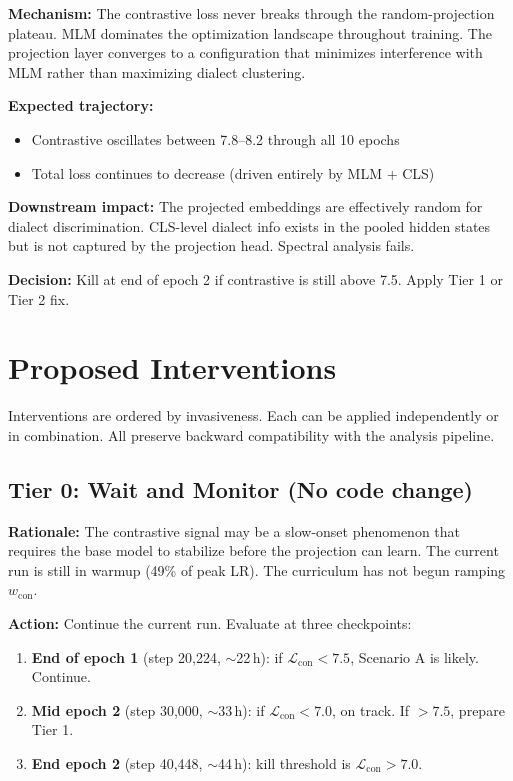 \documentclass[11pt,a4paper]{article}
\newcommand{\loss}{\mathcal{L}}
\begin{document}
\textbf{Mechanism:} The contrastive loss never breaks through the random-projection
plateau. MLM dominates the optimization landscape throughout training. The projection
layer converges to a configuration that minimizes interference with MLM rather than
maximizing dialect clustering.

\textbf{Expected trajectory:}
\begin{itemize}[nosep]
  \item Contrastive oscillates between 7.8--8.2 through all 10 epochs
  \item Total loss continues to decrease (driven entirely by MLM + CLS)
\end{itemize}

\textbf{Downstream impact:} The projected embeddings are effectively random for
dialect discrimination. CLS-level dialect info exists in the pooled hidden states
but is not captured by the projection head. Spectral analysis fails.

\textbf{Decision:} Kill at end of epoch 2 if contrastive is still above 7.5. Apply
Tier 1 or Tier 2 fix.


\section{Proposed Interventions}
\label{sec:fixes}

Interventions are ordered by invasiveness. Each can be applied independently or
in combination. All preserve backward compatibility with the analysis pipeline.

\subsection{Tier 0: Wait and Monitor (No code change)}

\textbf{Rationale:} The contrastive signal may be a slow-onset phenomenon that
requires the base model to stabilize before the projection can learn. The current
run is still in warmup (49\% of peak LR). The curriculum has not begun ramping
$w_{\text{con}}$.

\textbf{Action:} Continue the current run. Evaluate at three checkpoints:
\begin{enumerate}[nosep]
  \item \textbf{End of epoch 1} (step 20{,}224, $\sim$22\,h): if $\loss_{\text{con}} < 7.5$, Scenario A is likely. Continue.
  \item \textbf{Mid epoch 2} (step 30{,}000, $\sim$33\,h): if $\loss_{\text{con}} < 7.0$, on track. If $> 7.5$, prepare Tier 1.
  \item \textbf{End epoch 2} (step 40{,}448, $\sim$44\,h): kill threshold is $\loss_{\text{con}} > 7.0$.
\end{enumerate}
\end{document}
